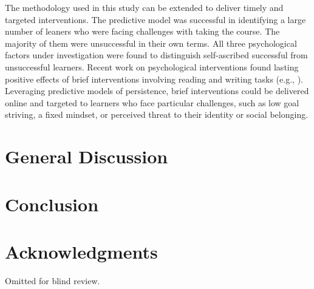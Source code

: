 \documentclass{sigchi}\usepackage[]{graphicx}\usepackage[]{color}
\begin{document}
The methodology used in this study can be extended to deliver timely and targeted interventions. The predictive model was successful in identifying a large number of leaners who were facing challenges with taking the course. The majority of them were unsuccessful in their own terms. All three psychological factors under investigation were found to distinguish self-ascribed successful from unsuccessful learners. Recent work on psychological interventions found lasting positive effects of brief interventions involving reading and writing tasks (e.g., \cite{walton2007question}).  Leveraging predictive models of persistence, brief interventions could be delivered online and targeted to learners who face particular challenges, such as low goal striving, a fixed mindset, or perceived threat to their identity or social belonging. 
 
\section{General Discussion}


\section{Conclusion}


\section{Acknowledgments}
Omitted for blind review.


\end{document}
